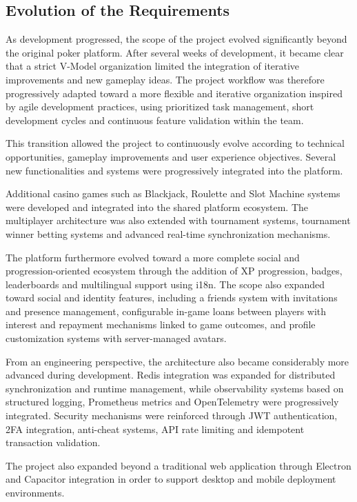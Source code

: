 \documentclass[11pt,a4paper]{article}
\begin{document}
\subsection{Evolution of the Requirements}

As development progressed, the scope of the project evolved significantly beyond the original poker platform. After several weeks of development, it became clear that a strict V-Model organization limited the integration of iterative improvements and new gameplay ideas. The project workflow was therefore progressively adapted toward a more flexible and iterative organization inspired by agile development practices, using prioritized task management, short development cycles and continuous feature validation within the team.

This transition allowed the project to continuously evolve according to technical opportunities, gameplay improvements and user experience objectives. Several new functionalities and systems were progressively integrated into the platform.

Additional casino games such as Blackjack, Roulette and Slot Machine systems were developed and integrated into the shared platform ecosystem. The multiplayer architecture was also extended with tournament systems, tournament winner betting systems and advanced real-time synchronization mechanisms.

The platform furthermore evolved toward a more complete social and progression-oriented ecosystem through the addition of XP progression, badges, leaderboards and multilingual support using i18n. The scope also expanded toward social and identity features, including a friends system with invitations and presence management, configurable in-game loans between players with interest and repayment mechanisms linked to game outcomes, and profile customization systems with server-managed avatars.

From an engineering perspective, the architecture also became considerably more advanced during development. Redis integration was expanded for distributed synchronization and runtime management, while observability systems based on structured logging, Prometheus metrics and OpenTelemetry were progressively integrated. Security mechanisms were reinforced through JWT authentication, 2FA integration, anti-cheat systems, API rate limiting and idempotent transaction validation.

The project also expanded beyond a traditional web application through Electron and Capacitor integration in order to support desktop and mobile deployment environments.
\end{document}
